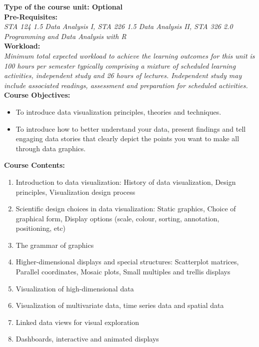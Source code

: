 \documentclass[a4paper,12pt]{article}
\begin{document}
\noindent\textbf{Type of the course unit: Optional}\\

\noindent\textbf{Pre-Requisites:}\\
\noindent\textit{{STA 124 1.5 Data Analysis I,  STA 226 1.5 Data Analysis II, STA 326 2.0 Programming and Data Analysis with R}}\\

\noindent\textbf{Workload:}\\
\noindent\textit{{ Minimum total expected workload to achieve the learning outcomes for this unit is 100 hours per semester typically comprising a mixture of scheduled learning activities, independent study and 26 hours of lectures. Independent study may include associated readings, assessment and preparation for scheduled activities.}}\\

\noindent\textbf{Course Objectives:}
\begin{itemize}
	\setlength\itemsep{0.1mm}
	\item To introduce data visualization principles, theories and techniques.
	\item To introduce how to better understand your data, present findings and tell engaging data stories that clearly depict the points you want to make all through data graphics.
\end{itemize}
\noindent\textbf{Course Contents:}
\begin{enumerate}[label*=\arabic*.]
	\setlength\itemsep{0.1mm}
	\item Introduction to data visualization: History of data visualization, Design principles, Visualization design process
	\item Scientific design choices in data visualization: Static graphics, Choice of graphical form, Display options (scale, colour, sorting, annotation, positioning, etc)
	\item The grammar of graphics
	\item Higher-dimensional displays and special structures: Scatterplot matrices, Parallel coordinates, Mosaic plots, Small multiples and trellis displays
	\item Visualization of high-dimensional data
	\item Visualization of multivariate data, time series data and spatial data
	\item Linked data views for visual exploration
  \item Dashboards, interactive and animated displays
\end{enumerate}
\end{document}
